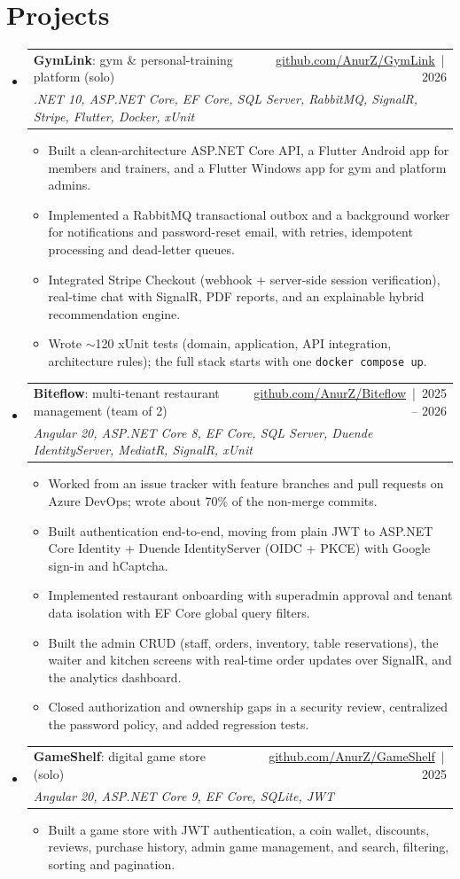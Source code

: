 \documentclass[a4paper,10.5pt]{article}
\makeatletter
\newcommand{\cvitem}[1]{\item\small{#1\vspace{-1pt}}}
\newcommand{\cvproject}[3]{
  \vspace{-1pt}\item
  \begin{tabular*}{\linewidth}[t]{l@{\extracolsep{\fill}}r}
    #1 & \small #2 \\
    \multicolumn{2}{l}{\textit{\small #3}} \\
  \end{tabular*}\vspace{-6pt}
}
\newcommand{\liststart}{\begin{itemize}[leftmargin=0.15in, label={}]}
\newcommand{\listend}{\end{itemize}}
\newcommand{\bulletstart}{\begin{itemize}[leftmargin=0.2in, itemsep=1pt]}
\newcommand{\bulletend}{\end{itemize}\vspace{-4pt}}
\makeatother
\begin{document}
\section{Projects}
\liststart
  \cvproject{\textbf{GymLink}: gym \& personal-training platform (solo)}
            {\href{https://github.com/AnurZ/GymLink}{github.com/AnurZ/GymLink} \,|\, 2026}
            {.NET 10, ASP.NET Core, EF Core, SQL Server, RabbitMQ, SignalR, Stripe, Flutter, Docker, xUnit}
  \bulletstart
    \cvitem{Built a clean-architecture ASP.NET Core API, a Flutter Android app for members and trainers, and a Flutter Windows app for gym and platform admins.}
    \cvitem{Implemented a RabbitMQ transactional outbox and a background worker for notifications and password-reset email, with retries, idempotent processing and dead-letter queues.}
    \cvitem{Integrated Stripe Checkout (webhook + server-side session verification), real-time chat with SignalR, PDF reports, and an explainable hybrid recommendation engine.}
    \cvitem{Wrote $\sim$120 xUnit tests (domain, application, API integration, architecture rules); the full stack starts with one \texttt{docker compose up}.}
  \bulletend

  \cvproject{\textbf{Biteflow}: multi-tenant restaurant management (team of 2)}
            {\href{https://github.com/AnurZ/Biteflow}{github.com/AnurZ/Biteflow} \,|\, 2025 -- 2026}
            {Angular 20, ASP.NET Core 8, EF Core, SQL Server, Duende IdentityServer, MediatR, SignalR, xUnit}
  \bulletstart
    \cvitem{Worked from an issue tracker with feature branches and pull requests on Azure DevOps; wrote about 70\% of the non-merge commits.}
    \cvitem{Built authentication end-to-end, moving from plain JWT to ASP.NET Core Identity + Duende IdentityServer (OIDC + PKCE) with Google sign-in and hCaptcha.}
    \cvitem{Implemented restaurant onboarding with superadmin approval and tenant data isolation with EF Core global query filters.}
    \cvitem{Built the admin CRUD (staff, orders, inventory, table reservations), the waiter and kitchen screens with real-time order updates over SignalR, and the analytics dashboard.}
    \cvitem{Closed authorization and ownership gaps in a security review, centralized the password policy, and added regression tests.}
  \bulletend

  \cvproject{\textbf{GameShelf}: digital game store (solo)}
            {\href{https://github.com/AnurZ/GameShelf}{github.com/AnurZ/GameShelf} \,|\, 2025}
            {Angular 20, ASP.NET Core 9, EF Core, SQLite, JWT}
  \bulletstart
    \cvitem{Built a game store with JWT authentication, a coin wallet, discounts, reviews, purchase history, admin game management, and search, filtering, sorting and pagination.}
  \bulletend
\listend
\end{document}
